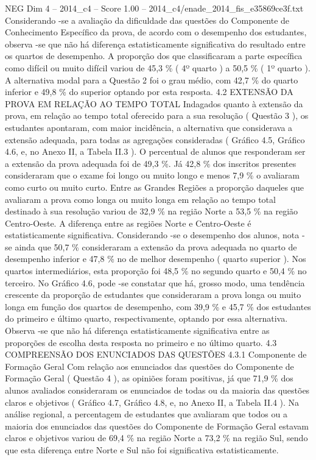 \begin{textsample}{NEG Dim 4 – 2014\_c4 – Score 1.00 – 2014\_c4/enade\_2014\_fis\_e35869ce3f.txt}
Considerando -se a avaliação da dificuldade das questões do Componente de Conhecimento Específico da prova, de acordo com o desempenho dos estudantes, observa -se que não há diferença estatisticamente significativa do resultado entre os quartos de desempenho.
A proporção dos que classificaram a parte específica como difícil ou muito difícil variou de 45,3 \% ( 4º quarto ) a 50,5 \% ( 1º quarto ).
A alternativa modal para a Questão 2 foi o grau médio, com 42,7 \% do quarto inferior e 49,8 \% do superior optando por esta resposta. 4.2 EXTENSÃO DA PROVA EM RELAÇÃO AO TEMPO TOTAL Indagados quanto à extensão da prova, em relação ao tempo total oferecido para a sua resolução ( Questão 3 ), os estudantes apontaram, com maior incidência, a alternativa que considerava a extensão adequada, para todas as agregações consideradas ( Gráfico 4.5, Gráfico 4.6, e, no Anexo II, a Tabela II.3 ).
O percentual de alunos que responderam ser a extensão da prova adequada foi de 49,3 \%.
Já 42,8 \% dos inscritos presentes consideraram que o exame foi longo ou muito longo e menos 7,9 \% o avaliaram como curto ou muito curto.
Entre as Grandes Regiões a proporção daqueles que avaliaram a prova como longa ou muito longa em relação ao tempo total destinado à sua resolução variou de 32,9 \% na região Norte a 53,5 \% na região Centro-Oeste.
A diferença entre as regiões Norte e Centro-Oeste é estatisticamente significativa.
Considerando -se o desempenho dos alunos, nota -se ainda que 50,7 \% consideraram a extensão da prova adequada no quarto de desempenho inferior e 47,8 \% no de melhor desempenho ( quarto superior ).
Nos quartos intermediários, esta proporção foi 48,5 \% no segundo quarto e 50,4 \% no terceiro.
No Gráfico 4.6, pode -se constatar que há, grosso modo, uma tendência crescente da proporção de estudantes que consideraram a prova longa ou muito longa em função dos quartos de desempenho, com 39,9 \% e 45,7 \% dos estudantes do primeiro e último quarto, respectivamente, optando por essa alternativa.
Observa -se que não há diferença estatisticamente significativa entre as proporções de escolha desta resposta no primeiro e no último quarto. 4.3 COMPREENSÃO DOS ENUNCIADOS DAS QUESTÕES 4.3.1 Componente de Formação Geral Com relação aos enunciados das questões do Componente de Formação Geral ( Questão 4 ), as opiniões foram positivas, já que 71,9 \% dos alunos avaliados consideraram os enunciados de todas ou da maioria das questões claros e objetivos ( Gráfico 4.7, Gráfico 4.8, e, no Anexo II, a Tabela II.4 ).
Na análise regional, a percentagem de estudantes que avaliaram que todos ou a maioria dos enunciados das questões do Componente de Formação Geral estavam claros e objetivos variou de 69,4 \% na região Norte a 73,2 \% na região Sul, sendo que esta diferença entre Norte e Sul não foi significativa estatisticamente.

\end{textsample}
